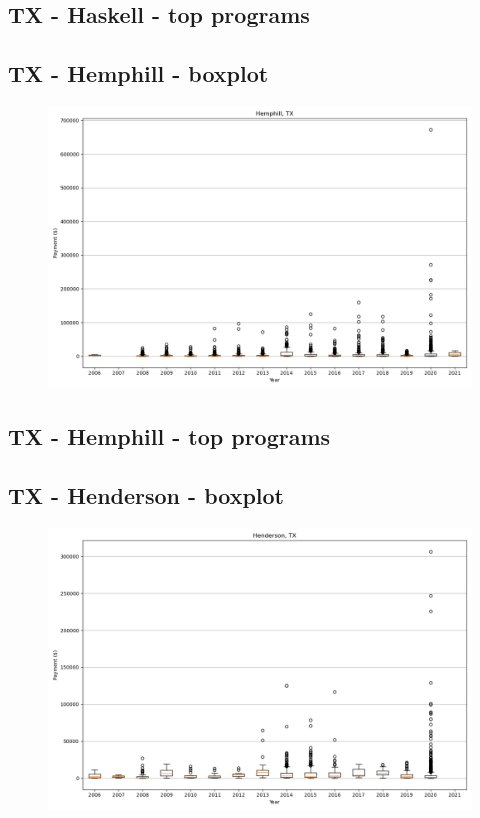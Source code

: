 \subsection*{TX - Haskell - top programs}

\newpage
\subsection*{TX - Hemphill - boxplot}
\begin{figure}[h]
\centering
\includegraphics[width=7in]{../output/boxplots/counties/Hemphill-TX_boxplot.png}
\end{figure}


\subsection*{TX - Hemphill - top programs}

\newpage
\subsection*{TX - Henderson - boxplot}
\begin{figure}[h]
\centering
\includegraphics[width=7in]{../output/boxplots/counties/Henderson-TX_boxplot.png}
\end{figure}


